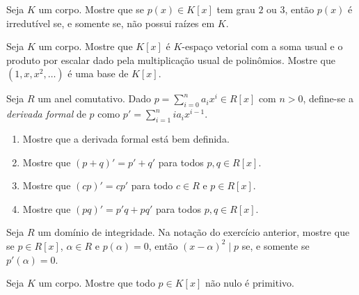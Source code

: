 \begin{exer}
    Seja $K$ um corpo. Mostre que se $p(x)\in K[x]$ tem grau $2$ ou $3$, então $p(x)$ é irredutível se, e somente se, não possui raízes em $K$.
\end{exer}

\begin{exer}
    Seja $K$ um corpo. Mostre que $K[x]$ é $K$-espaço vetorial com a soma usual e o produto por escalar dado pela multiplicação usual de polinômios. Mostre que $(1, x, x^2, \dots)$ é uma base de $K[x]$.
\end{exer}

\begin{exer}
    Seja $R$ um anel comutativo. Dado $p=\sum_{i=0}^n a_ix^i\in R[x]$ com $n>0$, define-se a \emph{derivada formal} de $p$ como $p'=\sum_{i=1}^{n} ia_i x^{i-1}$.
    \begin{enumerate}
        \item Mostre que a derivada formal está bem definida.
        \item Mostre que $(p+q)'=p'+q'$ para todos $p, q \in R[x]$.
        \item Mostre que $(cp)'=cp'$ para todo $c \in R$ e $p \in R[x]$.
        \item Mostre que $(pq)'=p'q+pq'$ para todos $p, q \in R[x]$.
    \end{enumerate}
\end{exer}

\begin{exer}
    Seja $R$ um domínio de integridade. Na notação do exercício anterior, mostre que se $p \in R[x]$, $\alpha \in R$ e $p(\alpha)=0$, então $(x-\alpha)^2\mid p$ se, e somente se $p'(\alpha)=0$.
\end{exer}

\begin{exer}
    Seja $K$ um corpo. Mostre que todo $p \in K[x]$ não nulo é primitivo.
\end{exer}

